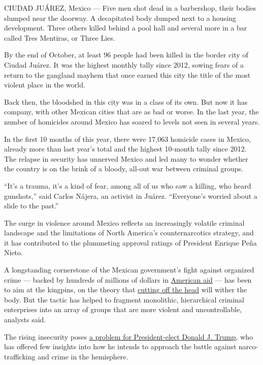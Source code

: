 CIUDAD JUÁREZ, Mexico --- Five men shot dead in a barbershop, their
bodies slumped near the doorway. A decapitated body dumped next to a
housing development. Three others killed behind a pool hall and several
more in a bar called Tres Mentiras, or Three Lies.

By the end of October, at least 96 people had been killed in the border
city of Ciudad Juárez. It was the highest monthly tally since 2012,
sowing fears of a return to the gangland mayhem that once earned this
city the title of the most violent place in the world.

Back then, the bloodshed in this city was in a class of its own. But now
it has company, with other Mexican cities that are as bad or worse. In
the last year, the number of homicides around Mexico has soared to
levels not seen in several years.

In the first 10 months of this year, there were 17,063 homicide cases in
Mexico, already more than last year's total and the highest 10-month
tally since 2012. The relapse in security has unnerved Mexico and led
many to wonder whether the country is on the brink of a bloody, all-out
war between criminal groups.

``It's a trauma, it's a kind of fear, among all of us who saw a killing,
who heard gunshots,'' said Carlos Nájera, an activist in Juárez.
``Everyone's worried about a slide to the past.''

The surge in violence around Mexico reflects an increasingly volatile
criminal landscape and the limitations of North America's
counternarcotics strategy, and it has contributed to the plummeting
approval ratings of President Enrique Peña Nieto.

A longstanding cornerstone of the Mexican government's fight against
organized crime --- backed by hundreds of millions of dollars in
\href{http://www.nytimes.com/2011/08/07/world/07drugs.html}{American
aid} --- has been to aim at the kingpins, on the theory that
\href{https://www.nytimes.com/2016/01/09/world/americas/El-Chapo-captured-mexico.html}{cutting
off the head} will wither the body. But the tactic has helped to
fragment monolithic, hierarchical criminal enterprises into an array of
groups that are more violent and uncontrollable, analysts said.

The rising insecurity poses
\href{https://www.nytimes.com/2016/11/10/world/americas/mexico-donald-trump-peso.html}{a
problem for President-elect Donald J. Trump}, who has offered few
insights into how he intends to approach the battle against
narco-trafficking and crime in the hemisphere.

